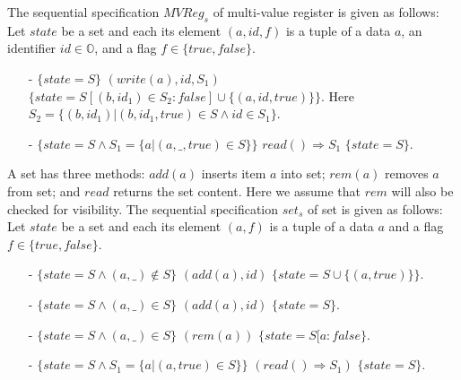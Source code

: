 \begin{example}
\label{def:spec-MVR}
The sequential specification $\mathit{MVReg}_s$ of multi-value
register is given as follows: Let $\mathit{state}$ be a set and each
its element $(a,\mathit{id},f)$ is a tuple of a data $a$, an
identifier $\mathit{id} \in \mathbb{O}$, and a flag $f \in \{
\mathit{true},\mathit{false} \}$.
\begin{itemize}
\setlength{\itemsep}{0.5pt}
\item[-] $\{ \mathit{state} = S \}$ $(write(a),\mathit{id},S_1)$ $\{
  \mathit{state} = S[(b,\mathit{id}_1) \in S_2 : \mathit{false}] \cup
  \{ (a,id,\mathit{true}) \} \}$. Here $S_2 = \{ (b,\mathit{id}_1)
  \vert (b,\mathit{id}_1,\mathit{true}) \in S \wedge id \in S_1 \}$.
\item[-] $\{ \mathit{state} = S \wedge S_1 = \{ a \vert
  (a,\_,\mathit{true}) \in S \} \}$ $read() \Rightarrow S_1$ $\{
  \mathit{state} = S \}$.
\end{itemize}
\end{example}

\begin{example}
\label{definition:sequential specification of set}
A set has three methods: $\mathit{add}(a)$ inserts item $a$ into set;
$\mathit{rem}(a)$ removes $a$ from set; and $\mathit{read}$ returns
the set content.
Here we assume that $\mathit{rem}$ will also be checked for
visibility.
The sequential specification $\mathit{set}_s$ of set is given as
follows:  Let $\mathit{state}$ be a set and each its element $(a,f)$
is a tuple of a data $a$ and a flag $f \in \{ \mathit{true},\mathit{false} \}$.
\begin{itemize}
\setlength{\itemsep}{0.5pt}
\item[-] $\{ \mathit{state} = S \wedge (a,\_) \notin S \}$
  $(\mathit{add}(a),\mathit{id})$ $\{ \mathit{state} = S \cup \{
  (a,\mathit{true}) \} \}$.
\item[-] $\{ \mathit{state} = S \wedge (a,\_) \in S \}$
  $(\mathit{add}(a),\mathit{id})$ $\{ \mathit{state} = S \}$.
\item[-] $\{ \mathit{state} = S \wedge (a,\_) \in S \}$
  $(\mathit{rem}(a))$ $\{ \mathit{state} = S[a: \mathit{false} \}$.
\item[-] $\{ \mathit{state} = S \wedge S_1 = \{a \vert
  (a,\mathit{true}) \in S \} \}$ $(\mathit{read}() \Rightarrow S_1)$
  $\{ \mathit{state} = S \}$.
\end{itemize}
\end{example}

